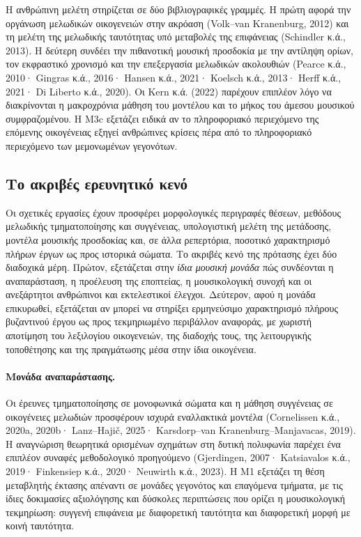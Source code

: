 \documentclass[11pt,a4paper]{article}
\begin{document}
Η ανθρώπινη μελέτη στηρίζεται σε δύο βιβλιογραφικές γραμμές. Η πρώτη αφορά την οργάνωση μελωδικών οικογενειών στην ακρόαση (Volk--van Kranenburg, 2012) και τη μελέτη της μελωδικής ταυτότητας υπό μεταβολές της επιφάνειας (Schindler κ.ά., 2013). Η δεύτερη συνδέει την πιθανοτική μουσική προσδοκία με την αντίληψη ορίων, τον εκφραστικό χρονισμό και την επεξεργασία μελωδικών ακολουθιών (Pearce κ.ά., 2010· Gingras κ.ά., 2016· Hansen κ.ά., 2021· Koelsch κ.ά., 2013· Herff κ.ά., 2021· Di Liberto κ.ά., 2020). Οι Kern κ.ά. (2022) παρέχουν επιπλέον λόγο να διακρίνονται η μακροχρόνια μάθηση του μοντέλου και το μήκος του άμεσου μουσικού συμφραζομένου. Η M3c εξετάζει ειδικά αν το πληροφοριακό περιεχόμενο της επόμενης οικογένειας εξηγεί ανθρώπινες κρίσεις πέρα από το πληροφοριακό περιεχόμενο των μεμονωμένων γεγονότων.

\subsection{Το ακριβές ερευνητικό κενό}

Οι σχετικές εργασίες έχουν προσφέρει μορφολογικές περιγραφές θέσεων, μεθόδους μελωδικής τμηματοποίησης και συγγένειας, υπολογιστική μελέτη της μετάδοσης, μοντέλα μουσικής προσδοκίας και, σε άλλα ρεπερτόρια, ποσοτικό χαρακτηρισμό πλήρων έργων ως προς ιστορικά σώματα. Το ακριβές κενό της πρότασης έχει δύο διαδοχικά μέρη. Πρώτον, εξετάζεται στην \emph{ίδια μουσική μονάδα} πώς συνδέονται η αναπαράσταση, η προέλευση της εποπτείας, η μουσικολογική συνοχή και οι ανεξάρτητοι ανθρώπινοι και εκτελεστικοί έλεγχοι. Δεύτερον, αφού η μονάδα επικυρωθεί, εξετάζεται αν μπορεί να στηρίξει ερμηνεύσιμο χαρακτηρισμό πλήρους βυζαντινού έργου ως προς τεκμηριωμένο περιβάλλον αναφοράς, με χωριστή αποτίμηση του λεξιλογίου οικογενειών, της διαδοχής τους, της λειτουργικής τοποθέτησης και της πραγμάτωσης μέσα στην ίδια οικογένεια.

\paragraph{Μονάδα αναπαράστασης.} Οι έρευνες τμηματοποίησης σε μονοφωνικά σώματα και η μάθηση συγγένειας σε οικογένειες μελωδιών προσφέρουν ισχυρά εναλλακτικά μοντέλα (Cornelissen κ.ά., 2020a, 2020b· Lanz--Hajič, 2025· Karsdorp--van Kranenburg--Manjavacas, 2019). Η αναγνώριση θεωρητικά ορισμένων σχημάτων στη δυτική πολυφωνία παρέχει ένα επιπλέον συναφές μεθοδολογικό προηγούμενο (Gjerdingen, 2007· Katsiavalos κ.ά., 2019· Finkensiep κ.ά., 2020· Neuwirth κ.ά., 2023). Η M1 εξετάζει τη θέση μεταβλητής έκτασης απέναντι σε μονάδες γεγονότος και επαγόμενα τμήματα, με τις ίδιες δοκιμασίες αξιολόγησης και δύσκολες περιπτώσεις που ορίζει η μουσικολογική τεκμηρίωση: συγγενή επιφάνεια με διαφορετική ταυτότητα και διαφορετική μορφή με κοινή ταυτότητα.
\end{document}
